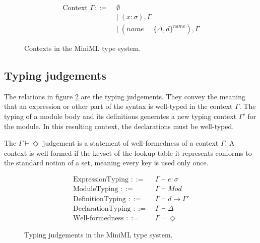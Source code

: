 \documentclass[10pt,a4paper,draft]{article}
\begin{document}
\begin{flushleft}
\begin{figure}[!htbp]
\begin{align*}
\text{Context }\Gamma ::=\; &\emptyset \\
&| \; (x:\sigma),\Gamma \\
&| \; (name=\lbrace \overline{\Delta},\overline{d}\rbrace^{name}), \Gamma
\end{align*}
\caption{Contexts in the MiniML type system.}
\label{fig:Contexts}
\end{figure}

\subsection{Typing judgements}
The relations in figure \ref{fig:TypingJudgements} are the typing judgements. They convey the meaning that an expression or other part of the syntax is well-typed in the context $\Gamma$. The typing of a module body and its definitions generates a new typing context $\Gamma'$ for the module. In this resulting context, the declarations must be well-typed.

The $\Gamma \vdash \Diamond$ judgement is a statement of well-formedness of a context $\Gamma$. A context is well-formed if the keyset of the lookup table it represents conforms to the standard notion of a set, meaning every key is used only once.

\begin{figure}[!htbp]
\begin{align*}
\text{ExpressionTyping } ::=\;&\Gamma \vdash e: \sigma \\
\text{ModuleTyping } ::= \; &\Gamma \vdash \mathit{Mod} \\
\text{DefinitionTyping } ::= \; &\Gamma \vdash d \rightarrow \Gamma' \\
\text{DeclarationTyping } ::= \;&\Gamma \vdash \Delta \\
\text{Well-formedness } ::=\;&\Gamma \vdash \Diamond
\end{align*}
\caption{Typing judgements in the MiniML type system.}
\label{fig:TypingJudgements}
\end{figure}


\end{flushleft}
\end{document}
